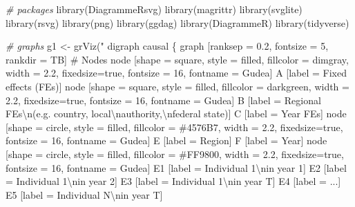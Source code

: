 \documentclass[
]{article}
\newenvironment{Shaded}{\begin{snugshade}}{\end{snugshade}}
\newcommand{\CommentTok}[1]{\textcolor[rgb]{0.56,0.35,0.01}{\textit{#1}}}
\newcommand{\FunctionTok}[1]{\textcolor[rgb]{0.00,0.00,0.00}{#1}}
\newcommand{\NormalTok}[1]{#1}
\newcommand{\OtherTok}[1]{\textcolor[rgb]{0.56,0.35,0.01}{#1}}
\newcommand{\SpecialCharTok}[1]{\textcolor[rgb]{0.00,0.00,0.00}{#1}}
\newcommand{\StringTok}[1]{\textcolor[rgb]{0.31,0.60,0.02}{#1}}
\begin{document}
\begin{Shaded}
\begin{Highlighting}[]
\CommentTok{\# packages }
\FunctionTok{library}\NormalTok{(DiagrammeRsvg)}
\FunctionTok{library}\NormalTok{(magrittr)}
\FunctionTok{library}\NormalTok{(svglite)}
\FunctionTok{library}\NormalTok{(rsvg)}
\FunctionTok{library}\NormalTok{(png)}
\FunctionTok{library}\NormalTok{(ggdag)}
\FunctionTok{library}\NormalTok{(DiagrammeR)}
\FunctionTok{library}\NormalTok{(tidyverse)}

\CommentTok{\# graphs }
\NormalTok{g1 }\OtherTok{\textless{}{-}} \FunctionTok{grViz}\NormalTok{(}\StringTok{"}
\StringTok{    digraph causal \{}
\StringTok{    graph [ranksep = 0.2, fontsize = 5, rankdir = TB]}
\StringTok{      \# Nodes}
\StringTok{      node [shape = square, style = filled, fillcolor = dimgray, width = 2.2, fixedsize=true, fontsize = 16, fontname = \textquotesingle{}Gudea\textquotesingle{}]}
\StringTok{      A [label = \textquotesingle{}Fixed effects (FEs)\textquotesingle{}]}
\StringTok{      node [shape = square, style = filled, fillcolor = darkgreen, width = 2.2, fixedsize=true, fontsize = 16, fontname = \textquotesingle{}Gudea\textquotesingle{}]}
\StringTok{      B [label = \textquotesingle{}Regional FEs}\SpecialCharTok{\textbackslash{}n}\StringTok{(e.g. country, local}\SpecialCharTok{\textbackslash{}n}\StringTok{authority,}\SpecialCharTok{\textbackslash{}n}\StringTok{federal state)\textquotesingle{}]}
\StringTok{      C [label = \textquotesingle{}Year FEs\textquotesingle{}]}
\StringTok{      node [shape = circle, style = filled, fillcolor = \textquotesingle{}\#4576B7\textquotesingle{}, width = 2.2, fixedsize=true, fontsize = 16, fontname = \textquotesingle{}Gudea\textquotesingle{}]}
\StringTok{      E [label = \textquotesingle{}Region\textquotesingle{}]}
\StringTok{      F [label = \textquotesingle{}Year\textquotesingle{}]}
\StringTok{      node [shape = circle, style = filled, fillcolor = \textquotesingle{}\#FF9800\textquotesingle{}, width = 2.2, fixedsize=true, fontsize = 16, fontname = \textquotesingle{}Gudea\textquotesingle{}]}
\StringTok{      E1 [label = \textquotesingle{}Individual 1}\SpecialCharTok{\textbackslash{}n}\StringTok{in year 1\textquotesingle{}]}
\StringTok{      E2 [label = \textquotesingle{}Individual 1}\SpecialCharTok{\textbackslash{}n}\StringTok{in year 2\textquotesingle{}]}
\StringTok{      E3 [label = \textquotesingle{}Individual 1}\SpecialCharTok{\textbackslash{}n}\StringTok{in year T\textquotesingle{}]}
\StringTok{      E4 [label = \textquotesingle{}...\textquotesingle{}]}
\StringTok{      E5 [label = \textquotesingle{}Individual N}\SpecialCharTok{\textbackslash{}n}\StringTok{in year T\textquotesingle{}]}

\end{Highlighting}
\end{Shaded}
\end{document}
